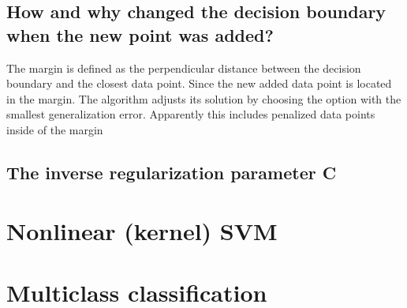 \documentclass{article}
\begin{document}
\subsection{How and why changed the decision boundary when the new point was added?}

The margin is defined as the perpendicular distance between the decision boundary and the closest data point. Since the new added data point is located in the margin. The algorithm adjusts its solution by choosing the option with the smallest generalization error. Apparently this includes penalized data points inside of the margin

\subsection{The inverse regularization parameter C}


\section{Nonlinear (kernel) SVM}

\subsection{}

\subsection{}

\subsection{}

\subsection{}

\subsection{}


\section{Multiclass classification}

\subsection{}
\end{document}
